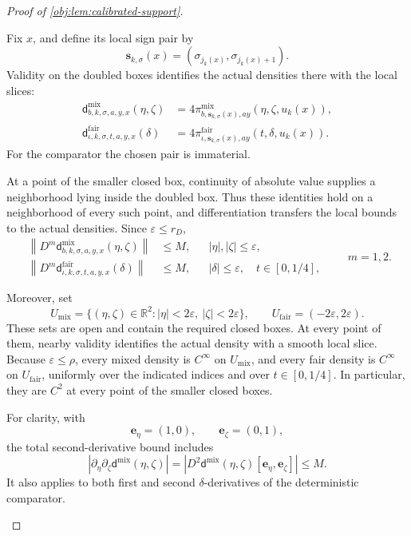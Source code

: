 \documentclass[11pt]{article}
\begin{document}
\begin{proof}[Proof of \cref{obj:lem:calibrated-support}]
\begin{enumerate}
Fix \(x\), and define its local sign pair by
\[
\mathbf s_{k,\sigma}(x)
=(\sigma_{j_k(x)},\sigma_{j_k(x)+1}).
\]
Validity on the doubled boxes identifies the actual densities there with the local slices:
\[
\begin{aligned}
\mathsf d^{\mathrm{mix}}_{b,k,\sigma,a,y,x}(\eta,\zeta)
&=4\pi^{\mathrm{mix}}_{b,\mathbf s_{k,\sigma}(x),ay}
                    (\eta,\zeta,u_k(x)),\\
\mathsf d^{\mathrm{fair}}_{\iota,k,\sigma,t,a,y,x}(\delta)
&=4\pi^{\mathrm{fair}}_{\iota,\mathbf s_{k,\sigma}(x),ay}
                    (t,\delta,u_k(x)).
\end{aligned}
\]
For the comparator the chosen pair is immaterial.

At a point of the smaller closed box, continuity of absolute value supplies a neighborhood lying inside the doubled box. Thus these identities hold on a neighborhood of every such point, and differentiation transfers the local bounds to the actual densities. Since \(\varepsilon\le r_D\),
\[
\begin{aligned}
\left\|D^m\mathsf d^{\mathrm{mix}}_{b,k,\sigma,a,y,x}
                            (\eta,\zeta)\right\|&\le M,
&&|\eta|,|\zeta|\le\varepsilon,\\
\left\|D^m\mathsf d^{\mathrm{fair}}_{\iota,k,\sigma,t,a,y,x}
                            (\delta)\right\|&\le M,
&&|\delta|\le\varepsilon,\quad t\in[0,1/4],
\end{aligned}
\qquad m=1,2.
\]

Moreover, set
\[
U_{\mathrm{mix}}
=\{(\eta,\zeta)\in\mathbb R^2:
                   |\eta|<2\varepsilon,\ |\zeta|<2\varepsilon\},
\qquad
U_{\mathrm{fair}}
=(-2\varepsilon,2\varepsilon).
\]
These sets are open and contain the required closed boxes. At every point of them, nearby validity identifies the actual density with a smooth local slice. Because \(\varepsilon\le\rho\), every mixed density is \(C^\infty\) on \(U_{\mathrm{mix}}\), and every fair density is \(C^\infty\) on \(U_{\mathrm{fair}}\), uniformly over the indicated indices and over \(t\in[0,1/4]\). In particular, they are \(C^2\) at every point of the smaller closed boxes.

For clarity, with
\[
\mathbf e_\eta=(1,0),\qquad \mathbf e_\zeta=(0,1),
\]
the total second-derivative bound includes
\[
\left|\partial_\eta\partial_\zeta
       \mathsf d^{\mathrm{mix}}(\eta,\zeta)\right|
=\left|D^2\mathsf d^{\mathrm{mix}}(\eta,\zeta)
                  [\mathbf e_\eta,\mathbf e_\zeta]\right|
\le M.
\]
It also applies to both first and second \(\delta\)-derivatives of the deterministic comparator.


\end{enumerate}
\end{proof}
\end{document}
